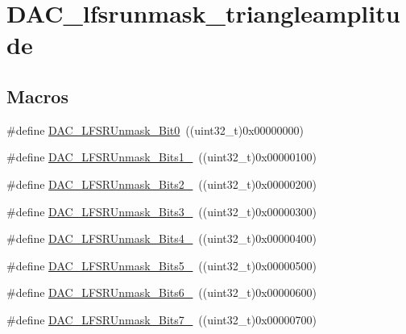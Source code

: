 \hypertarget{group___d_a_c__lfsrunmask__triangleamplitude}{}\section{D\+A\+C\+\_\+lfsrunmask\+\_\+triangleamplitude}
\label{group___d_a_c__lfsrunmask__triangleamplitude}
\subsection*{Macros}
\begin{DoxyCompactItemize}
\item 
\#define \mbox{\hyperlink{group___d_a_c__lfsrunmask__triangleamplitude_ga60794fd5092a332cfa82e1cee13945fc}{D\+A\+C\+\_\+\+L\+F\+S\+R\+Unmask\+\_\+\+Bit0}}~((uint32\+\_\+t)0x00000000)
\item 
\#define \mbox{\hyperlink{group___d_a_c__lfsrunmask__triangleamplitude_ga09f47cfa563252a1add4662284350c07}{D\+A\+C\+\_\+\+L\+F\+S\+R\+Unmask\+\_\+\+Bits1\+\_}}~((uint32\+\_\+t)0x00000100)
\item 
\#define \mbox{\hyperlink{group___d_a_c__lfsrunmask__triangleamplitude_ga60b800857b7e33d9c0be2846fc56849f}{D\+A\+C\+\_\+\+L\+F\+S\+R\+Unmask\+\_\+\+Bits2\+\_}}~((uint32\+\_\+t)0x00000200)
\item 
\#define \mbox{\hyperlink{group___d_a_c__lfsrunmask__triangleamplitude_gafe219362b3a48d8678a65ef38cb45532}{D\+A\+C\+\_\+\+L\+F\+S\+R\+Unmask\+\_\+\+Bits3\+\_}}~((uint32\+\_\+t)0x00000300)
\item 
\#define \mbox{\hyperlink{group___d_a_c__lfsrunmask__triangleamplitude_ga2543d802e19d592a26c8231be663cdac}{D\+A\+C\+\_\+\+L\+F\+S\+R\+Unmask\+\_\+\+Bits4\+\_}}~((uint32\+\_\+t)0x00000400)
\item 
\#define \mbox{\hyperlink{group___d_a_c__lfsrunmask__triangleamplitude_ga71a01660d410823bfe76a603080dc125}{D\+A\+C\+\_\+\+L\+F\+S\+R\+Unmask\+\_\+\+Bits5\+\_}}~((uint32\+\_\+t)0x00000500)
\item 
\#define \mbox{\hyperlink{group___d_a_c__lfsrunmask__triangleamplitude_ga48fe2d3f4274d6bf28e446ca0001ed5d}{D\+A\+C\+\_\+\+L\+F\+S\+R\+Unmask\+\_\+\+Bits6\+\_}}~((uint32\+\_\+t)0x00000600)
\item 
\#define \mbox{\hyperlink{group___d_a_c__lfsrunmask__triangleamplitude_gaf0a93c1ee1e13776fae7558b36243431}{D\+A\+C\+\_\+\+L\+F\+S\+R\+Unmask\+\_\+\+Bits7\+\_}}~((uint32\+\_\+t)0x00000700)
\item 

\end{DoxyCompactItemize}
